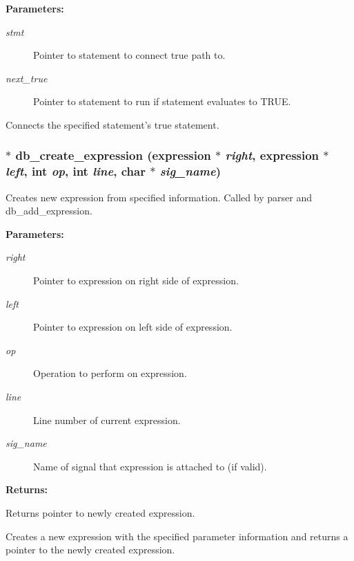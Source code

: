 \begin{Desc}
\item[{\bf Parameters: }]\par
\begin{description}
\item[
{\em stmt}]Pointer to statement to connect true path to. \item[
{\em next\_\-true}]Pointer to statement to run if statement evaluates to TRUE.

\end{description}
\end{Desc}
Connects the specified statement's true statement. 
\subsubsection{$\ast$ db\_\-create\_\-expression ({\bf expression} $\ast$ {\em right}, {\bf expression} $\ast$ {\em left}, int {\em op}, int {\em line}, char $\ast$ {\em sig\_\-name})}\label{db_8h_a11}


Creates new expression from specified information. Called by parser and db\_\-add\_\-expression.

\begin{Desc}
\item[{\bf Parameters: }]\par
\begin{description}
\item[
{\em right}]Pointer to expression on right side of expression. \item[
{\em left}]Pointer to expression on left side of expression. \item[
{\em op}]Operation to perform on expression. \item[
{\em line}]Line number of current expression. \item[
{\em sig\_\-name}]Name of signal that expression is attached to (if valid).

\end{description}
\end{Desc}
\begin{Desc}
\item[{\bf Returns: }]\par
Returns pointer to newly created expression.

\end{Desc}
Creates a new expression with the specified parameter information and returns a pointer to the newly created expression. 
